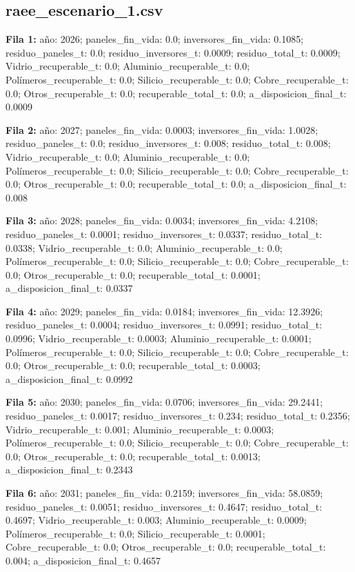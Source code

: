 \subsection*{raee\_escenario\_1.csv}
{\footnotesize\textbf{Fila 1:} año: 2026; paneles\_fin\_vida: 0.0; inversores\_fin\_vida: 0.1085; residuo\_paneles\_t: 0.0; residuo\_inversores\_t: 0.0009; residuo\_total\_t: 0.0009; Vidrio\_recuperable\_t: 0.0; Aluminio\_recuperable\_t: 0.0; Polímeros\_recuperable\_t: 0.0; Silicio\_recuperable\_t: 0.0; Cobre\_recuperable\_t: 0.0; Otros\_recuperable\_t: 0.0; recuperable\_total\_t: 0.0; a\_disposicion\_final\_t: 0.0009\par}
{\footnotesize\textbf{Fila 2:} año: 2027; paneles\_fin\_vida: 0.0003; inversores\_fin\_vida: 1.0028; residuo\_paneles\_t: 0.0; residuo\_inversores\_t: 0.008; residuo\_total\_t: 0.008; Vidrio\_recuperable\_t: 0.0; Aluminio\_recuperable\_t: 0.0; Polímeros\_recuperable\_t: 0.0; Silicio\_recuperable\_t: 0.0; Cobre\_recuperable\_t: 0.0; Otros\_recuperable\_t: 0.0; recuperable\_total\_t: 0.0; a\_disposicion\_final\_t: 0.008\par}
{\footnotesize\textbf{Fila 3:} año: 2028; paneles\_fin\_vida: 0.0034; inversores\_fin\_vida: 4.2108; residuo\_paneles\_t: 0.0001; residuo\_inversores\_t: 0.0337; residuo\_total\_t: 0.0338; Vidrio\_recuperable\_t: 0.0; Aluminio\_recuperable\_t: 0.0; Polímeros\_recuperable\_t: 0.0; Silicio\_recuperable\_t: 0.0; Cobre\_recuperable\_t: 0.0; Otros\_recuperable\_t: 0.0; recuperable\_total\_t: 0.0001; a\_disposicion\_final\_t: 0.0337\par}
{\footnotesize\textbf{Fila 4:} año: 2029; paneles\_fin\_vida: 0.0184; inversores\_fin\_vida: 12.3926; residuo\_paneles\_t: 0.0004; residuo\_inversores\_t: 0.0991; residuo\_total\_t: 0.0996; Vidrio\_recuperable\_t: 0.0003; Aluminio\_recuperable\_t: 0.0001; Polímeros\_recuperable\_t: 0.0; Silicio\_recuperable\_t: 0.0; Cobre\_recuperable\_t: 0.0; Otros\_recuperable\_t: 0.0; recuperable\_total\_t: 0.0003; a\_disposicion\_final\_t: 0.0992\par}
{\footnotesize\textbf{Fila 5:} año: 2030; paneles\_fin\_vida: 0.0706; inversores\_fin\_vida: 29.2441; residuo\_paneles\_t: 0.0017; residuo\_inversores\_t: 0.234; residuo\_total\_t: 0.2356; Vidrio\_recuperable\_t: 0.001; Aluminio\_recuperable\_t: 0.0003; Polímeros\_recuperable\_t: 0.0; Silicio\_recuperable\_t: 0.0; Cobre\_recuperable\_t: 0.0; Otros\_recuperable\_t: 0.0; recuperable\_total\_t: 0.0013; a\_disposicion\_final\_t: 0.2343\par}
{\footnotesize\textbf{Fila 6:} año: 2031; paneles\_fin\_vida: 0.2159; inversores\_fin\_vida: 58.0859; residuo\_paneles\_t: 0.0051; residuo\_inversores\_t: 0.4647; residuo\_total\_t: 0.4697; Vidrio\_recuperable\_t: 0.003; Aluminio\_recuperable\_t: 0.0009; Polímeros\_recuperable\_t: 0.0; Silicio\_recuperable\_t: 0.0001; Cobre\_recuperable\_t: 0.0; Otros\_recuperable\_t: 0.0; recuperable\_total\_t: 0.004; a\_disposicion\_final\_t: 0.4657\par}
